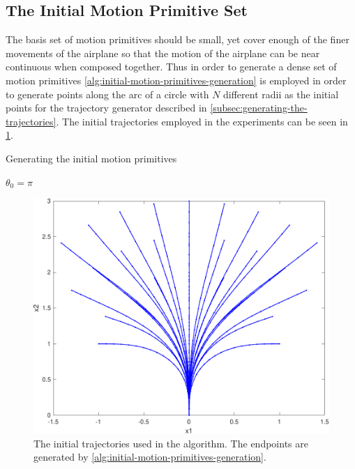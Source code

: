 \subsection{The Initial Motion Primitive Set}
\label{subsec:initial-motion-primitive}

The basis set of motion primitives should be small, yet cover enough of the
finer movements of the airplane so that the motion of the airplane can be near
continuous when composed together. Thus in order to generate a dense set of
motion primitives \cref{alg:initial-motion-primitives-generation} is employed in
order to generate points along the arc of a circle with \(N\) different radii as
the initial points for the trajectory generator described in
\cref{subsec:generating-the-trajectories}. The initial trajectories employed in
the experiments can be seen in \cref{fig:intial-trajectories-exp}.

\begin{algorithm}
  \caption{Generating the initial motion primitives}
  \label{alg:initial-motion-primitives-generation}
  \DontPrintSemicolon \SetAlgoNoLine

   

  \(\theta_{0} = \pi\) \;

  \;
\end{algorithm}

\begin{figure}
  \centering
  \includegraphics[width=.8\textwidth]{figures/experiments/initial-trajectories}
  \caption[The experiment trajectory set]{The initial trajectories used in the
    \rrtfunnel{} algorithm. The endpoints are generated by
    \cref{alg:initial-motion-primitives-generation}.}
  \label{fig:intial-trajectories-exp}
\end{figure}

